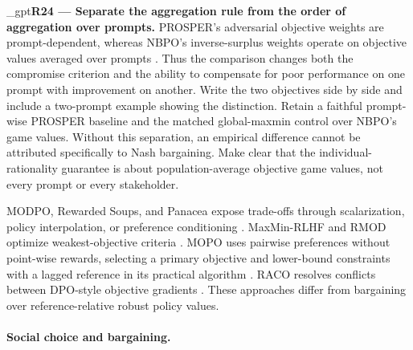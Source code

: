 \documentclass{article}
\newif\ifshowreviews
\newcommand{\reviewresponse}[1]{%
  \ifshowreviews
  \par\begingroup\color{blue!65!black}\hypersetup{allcolors=blue!65!black}\emergencystretch=2em%
  \noindent\textbf{Response:} #1\par\endgroup
  \fi}
\theoremstyle{remark}
\theoremstyle{plain}
\begin{document}
\kekim_gpt{\textbf{R24 --- Separate the aggregation rule from the order of aggregation over prompts.} PROSPER's adversarial objective weights are prompt-dependent, whereas NBPO's inverse-surplus weights operate on objective values averaged over prompts \citep{zhang2026prosper}. Thus the comparison changes both the compromise criterion and the ability to compensate for poor performance on one prompt with improvement on another. Write the two objectives side by side and include a two-prompt example showing the distinction. Retain a faithful prompt-wise PROSPER baseline and the matched global-maxmin control over NBPO's game values. Without this separation, an empirical difference cannot be attributed specifically to Nash bargaining. Make clear that the individual-rationality guarantee is about population-average objective game values, not every prompt or every stakeholder.}
\reviewresponse{\textbf{R24 --- Partially addressed.} Global Nash, matched global maxmin and prompt-wise PROSPER aggregation are distinguished, with the two-prompt example retained. PROSPER is labeled an adaptation, not a full reproduction. Its selected-policy negative prompt surpluses are not infeasibility certificates. Any checklist-based extension must preserve fixed semantic objective identities before applying NBPO's shared multipliers.}

MODPO, Rewarded Soups, and Panacea expose trade-offs through scalarization, policy interpolation, or preference conditioning \citep{zhou2024beyond,rame2023rewarded,zhong2024panacea}. MaxMin-RLHF and RMOD optimize weakest-objective criteria \citep{chakraborty2024maxmin,son2026rmod}. MOPO uses pairwise preferences without point-wise rewards, selecting a primary objective and lower-bound constraints with a lagged reference in its practical algorithm \citep{agnihotri2026mopo}. RACO resolves conflicts between DPO-style objective gradients \citep{chen2026raco}. These approaches differ from bargaining over reference-relative robust policy values.

\paragraph{Social choice and bargaining.}
\end{document}

